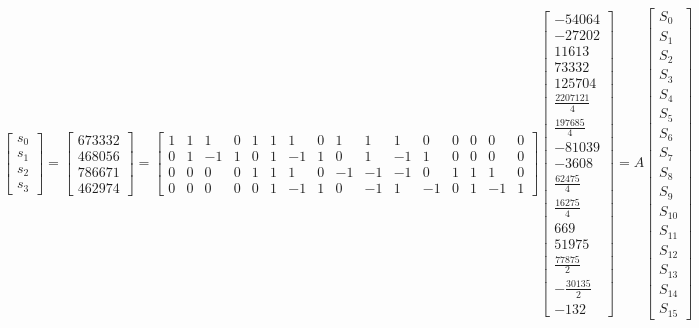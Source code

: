 \documentclass{article}%
\begin{document}
\[%
\left[\begin{matrix}s_{0}\\s_{1}\\s_{2}\\s_{3}\end{matrix}\right] = \left[\begin{matrix}673332\\468056\\786671\\462974\end{matrix}\right] = \left[\begin{array}{cccccccccccccccc}1 & 1 & 1 & 0 & 1 & 1 & 1 & 0 & 1 & 1 & 1 & 0 & 0 & 0 & 0 & 0\\0 & 1 & -1 & 1 & 0 & 1 & -1 & 1 & 0 & 1 & -1 & 1 & 0 & 0 & 0 & 0\\0 & 0 & 0 & 0 & 1 & 1 & 1 & 0 & -1 & -1 & -1 & 0 & 1 & 1 & 1 & 0\\0 & 0 & 0 & 0 & 0 & 1 & -1 & 1 & 0 & -1 & 1 & -1 & 0 & 1 & -1 & 1\end{array}\right] \left[\begin{matrix}-54064\\-27202\\11613\\73332\\125704\\\frac{2207121}{4}\\\frac{197685}{4}\\-81039\\-3608\\\frac{62475}{4}\\\frac{16275}{4}\\669\\51975\\\frac{77875}{2}\\- \frac{30135}{2}\\-132\end{matrix}\right] = A \left[\begin{matrix}S_{0}\\S_{1}\\S_{2}\\S_{3}\\S_{4}\\S_{5}\\S_{6}\\S_{7}\\S_{8}\\S_{9}\\S_{10}\\S_{11}\\S_{12}\\S_{13}\\S_{14}\\S_{15}\end{matrix}\right]%
\]%
\end{document}
